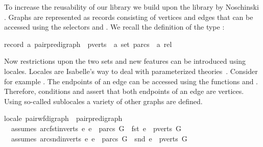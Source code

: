 %
\begin{isabellebody}%
%
%
\isadelimtheory
%
\endisadelimtheory
%
\isatagtheory
%
\endisatagtheory
{\isafoldtheory}%
%
\isadelimtheory
%
\endisadelimtheory
%
\isadelimdocument
%
\endisadelimdocument
%
\isatagdocument
%
\isamarkuptrue%
%
\endisatagdocument
{\isafolddocument}%
%
\isadelimdocument
%
\endisadelimdocument
%
\begin{isamarkuptext}%
\label{GraphTheory} To increase the reusability of our library we build upon the 
library by Noschinski \cite{Graph_Theory-AFP}. Graphs are represented as records consisting of vertices and edges that
can be accessed using the selectors  and . We recall the definition 
of the type :

\begin{isabelle}%
record\ {\isacharprime}a\ pair{\isacharunderscore}pre{\isacharunderscore}digraph\ {\isacharequal}\ pverts\ {\isacharcolon}{\isacharcolon}\ {\isachardoublequote}{\isacharprime}a\ set{\isachardoublequote}\ parcs\ {\isacharcolon}{\isacharcolon}\ {\isachardoublequote}{\isacharprime}a\ rel{\isachardoublequote}%
\end{isabelle}

Now restrictions upon the two sets and new features can be introduced using locales. 
Locales are Isabelle's way to deal with parameterized theories~\cite{ballarin2010tutorial}. Consider
for example .
The endpoints of an edge can be accessed using the functions  and . Therefore, conditions
 and  assert that both endpoints of an edge are
vertices. Using so-called sublocales a variety of other graphs are defined.  

%
\begin{isabelle}%
locale\ pair{\isacharunderscore}wf{\isacharunderscore}digraph\ {\isacharequal}\ pair{\isacharunderscore}pre{\isacharunderscore}digraph\ {\isacharplus}\isanewline
\ \ assumes\ arc{\isacharunderscore}fst{\isacharunderscore}in{\isacharunderscore}verts{\isacharcolon}\ {\isachardoublequote}{\isasymAnd}e{\isachardot}\ e\ {\isasymin}\ parcs\ G\ {\isasymLongrightarrow}\ fst\ e\ {\isasymin}\ pverts\ G{\isachardoublequote}\isanewline
\ \ assumes\ arc{\isacharunderscore}snd{\isacharunderscore}in{\isacharunderscore}verts{\isacharcolon}\ {\isachardoublequote}{\isasymAnd}e{\isachardot}\ e\ {\isasymin}\ parcs\ G\ {\isasymLongrightarrow}\ snd\ e\ {\isasymin}\ pverts\ G{\isachardoublequote}%
\end{isabelle}


\end{isamarkuptext}
\end{isabellebody}
